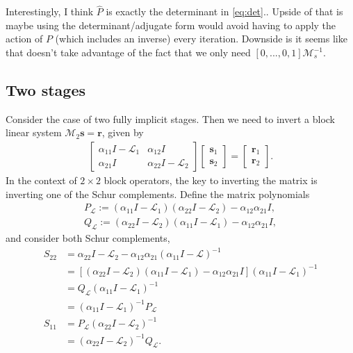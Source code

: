 \documentclass[a4paper,10pt]{article}
\begin{document}
{\color{blue}
Interestingly, I think $\widehat{P}$ is exactly the determinant in \eqref{eq:det}.. Upside
of that is maybe using the determinant/adjugate form would avoid having to apply the action
of $P$ (which includes an inverse) every iteration. Downside is it seems like that doesn't
take advantage of the fact that we only need $[0,...,0,1]\mathcal{M}_s^{-1}$.
}


\subsection{Two stages}

Consider the case of two fully implicit stages. Then we need to invert a block linear system
$\mathcal{M}_2\mathbf{s} = \mathbf{r}$, given by
%
\begin{align}\label{eq:Mnt}
\begin{bmatrix} \alpha_{11} I - \mathcal{L}_1 & \alpha_{12}I \\ \alpha_{21}I & \alpha_{22}I - \mathcal{L}_2\end{bmatrix}
	\begin{bmatrix}\mathbf{s}_1 \\ \mathbf{s}_2 \end{bmatrix} = 
	\begin{bmatrix}\mathbf{r}_1 \\ \mathbf{r}_2 \end{bmatrix}.
\end{align}
%
In the context of $2\times 2$ block operators, the key to inverting the matrix is inverting one of
the Schur complements. Define the matrix polynomials
%
\begin{align*}
P_{\mathcal{L}} := (\alpha_{11}I - \mathcal{L}_1)(\alpha_{22}I - \mathcal{L}_2) - \alpha_{12}\alpha_{21}I, \\
Q_{\mathcal{L}} := (\alpha_{22}I - \mathcal{L}_2)(\alpha_{11}I - \mathcal{L}_1) - \alpha_{12}\alpha_{21}I,
\end{align*}
%
and consider both Schur complements,
%
\begin{align*}
S_{22} & = \alpha_{22} I - \mathcal{L}_2 - \alpha_{12}\alpha_{21}(\alpha_{11} I - \mathcal{L} )^{-1} \\
& = \left[ ( \alpha_{22} I - \mathcal{L}_2)(\alpha_{11} I - \mathcal{L}_1) - \alpha_{12}\alpha_{21}I \right]
	(\alpha_{11} I - \mathcal{L}_1 )^{-1} \\
& = Q_{\mathcal{L}}(\alpha_{11} I - \mathcal{L}_1 )^{-1} \\
& = (\alpha_{11} I - \mathcal{L}_1 )^{-1}P_{\mathcal{L}} \\
S_{11} & = P_{\mathcal{L}}(\alpha_{22} I - \mathcal{L}_2 )^{-1} \\
& = (\alpha_{22} I - \mathcal{L}_2 )^{-1}Q_{\mathcal{L}}.
\end{align*}
\end{document}
